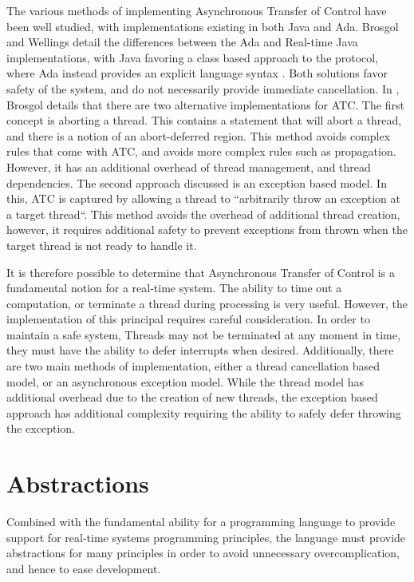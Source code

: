 \par\bigskip\noindent
The various methods of implementing Asynchronous Transfer
of Control have been well studied, with implementations existing in both Java
and Ada. Brosgol and Wellings detail the differences between the Ada and
Real-time Java implementations, with Java favoring a class based approach to
the protocol, where Ada instead provides an explicit language syntax
\cite{atc-article}. Both solutions favor safety of the system, and do not
necessarily provide immediate cancellation. In \cite{Brosgol:2002:ATC}, Brosgol
details that there are two alternative implementations for ATC. The first
concept is aborting a thread. This contains a statement that will abort a
thread, and there is a notion of an abort-deferred region. This method avoids
complex rules that come with ATC, and avoids more complex rules such as
propagation. However, it has an additional overhead of thread management, and
thread dependencies.  The second approach discussed is an exception based
model. In this, ATC is captured by allowing a thread to ``arbitrarily throw an
exception at a target thread``.  This method avoids the overhead of additional
thread creation, however, it requires additional safety to prevent exceptions
from thrown when the target thread is not ready to handle it.

\par\bigskip\noindent
It is therefore possible to determine that Asynchronous
Transfer of Control is a fundamental notion for a real-time system. The ability
to time out a computation, or terminate a thread during processing is very
useful. However, the implementation of this principal requires careful
consideration. In order to maintain a safe system, Threads may not be
terminated at any moment in time, they must have the ability to defer
interrupts when desired. Additionally, there are two main methods of
implementation, either a thread cancellation based model, or an asynchronous
exception model. While the thread model has additional overhead due to the
creation of new threads, the exception based approach has additional complexity
requiring the ability to safely defer throwing the exception. 

\section{Abstractions}

Combined with the fundamental ability for a programming language to provide
support for real-time systems programming principles, the language must provide
abstractions for many principles in order to avoid unnecessary
overcomplication, and hence to ease development.


